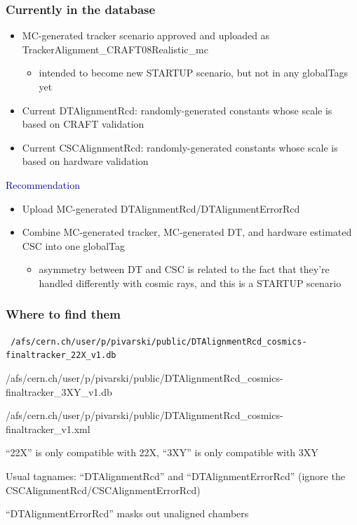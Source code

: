 \documentclass[compress]{beamer}
\begin{document}
\begin{frame}
\frametitle{Currently in the database}
\begin{itemize}
\item MC-generated tracker scenario approved and uploaded as TrackerAlignment\_CRAFT08Realistic\_mc
\begin{itemize}
\item intended to become new STARTUP scenario, but not in any globalTags yet
\end{itemize}
\item Current DTAlignmentRcd: randomly-generated constants whose scale is based on CRAFT validation
\item Current CSCAlignmentRcd: randomly-generated constants whose scale is based on hardware validation
\end{itemize}

\vspace{0.2 cm}
\hspace{-0.83 cm} \textcolor{darkblue}{\Large Recommendation}
\begin{itemize}
\item Upload MC-generated DTAlignmentRcd/DTAlignmentErrorRcd
\item Combine MC-generated tracker, MC-generated DT, and hardware estimated CSC into one globalTag
\begin{itemize}
\item asymmetry between DT and CSC is related to the fact that they're handled differently with cosmic rays, and this is a STARTUP scenario
\end{itemize}
\end{itemize}
\end{frame}

\begin{frame}
\frametitle{Where to find them}

{\tt \tiny
/afs/cern.ch/user/p/pivarski/public/DTAlignmentRcd\_cosmics-finaltracker\_22X\_v1.db

/afs/cern.ch/user/p/pivarski/public/DTAlignmentRcd\_cosmics-finaltracker\_3XY\_v1.db

/afs/cern.ch/user/p/pivarski/public/DTAlignmentRcd\_cosmics-finaltracker\_v1.xml}

\vfill

``22X'' is only compatible with 22X, ``3XY'' is only compatible with 3XY

\vfill

Usual tagnames: ``DTAlignmentRcd'' and ``DTAlignmentErrorRcd'' (ignore the CSCAlignmentRcd/CSCAlignmentErrorRcd)

\vfill
``DTAlignmentErrorRcd'' masks out unaligned chambers

\label{numpages}
\end{frame}
\end{document}

